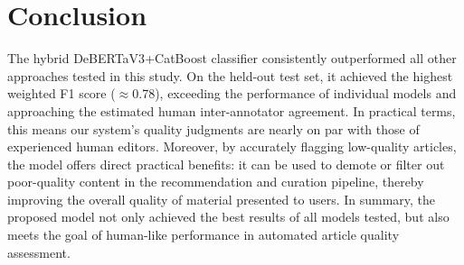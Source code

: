 
\chapter{Conclusion\label{chap:conclusion}}

The hybrid \ac{DeBERTaV3}+\ac{CatBoost} classifier consistently outperformed all other approaches tested in this study. On the held-out test set, it achieved the highest weighted F1 score ($\approx$0.78), exceeding the performance of individual models and approaching the estimated human inter-annotator agreement. 
In practical terms, this means our system’s quality judgments are nearly on par with those of experienced human editors. Moreover, by accurately flagging low-quality articles, the model offers direct practical benefits: it can be used to demote or filter out poor-quality content in the recommendation and curation pipeline, thereby improving the overall quality of material presented to users. In summary, the proposed model not only achieved the best results of all models tested, but also meets the goal of human-like performance in automated article quality assessment.